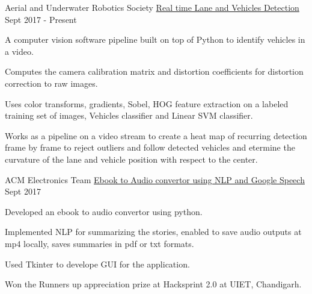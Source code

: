 
\begin{cventries}
\cventry
    {Aerial and Underwater Robotics Society }
    {\href{https://github.com/akhilesh-k/Lane-and-Vehicles-Detection}{Real time Lane and Vehicles Detection}}
    {}
    {Sept 2017 - Present}
    {
      \begin{cvitems}
        \item {A computer vision software pipeline built on top of Python to identify vehicles in a video.}
        \item{Computes the camera calibration matrix and distortion coefficients for  distortion correction to raw images.}
        \item {Uses color transforms, gradients, Sobel, HOG feature extraction on a labeled training set of images, Vehicles classifier and Linear SVM classifier.}
        \item{Works as a pipeline on a video stream to create a heat map of recurring detection frame by frame to reject outliers and follow detected vehicles and etermine the curvature of the lane and vehicle position with respect to the center.}
      \end{cvitems}
    }
\cventry
    {ACM Electronics Team}
    {\href{https://github.com/akhilesh-k/BookWorm}{Ebook to Audio convertor using NLP and Google Speech}}
    {}
    {Sept 2017}
    {
      \begin{cvitems}
        \item {Developed an ebook to audio convertor using python.}
        \item{Implemented NLP for summarizing the stories, enabled to save audio outputs at mp4 locally, saves summaries in pdf or txt formats.}
        \item {Used Tkinter to develope GUI for the application.}
        \item{Won the Runners up appreciation prize at Hacksprint 2.0 at UIET, Chandigarh.}
      \end{cvitems}
    }

\end{cventries}
